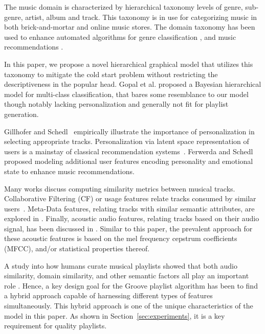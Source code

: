 The music domain is characterized by hierarchical taxonomy levels of genre, sub-genre, artist, album and track. This taxonomy is in use for categorizing music in both brick-and-mortar and online music stores. The domain taxonomy has been used to enhance automated algorithms for genre classification \cite{DecoroEtAl_2007_BayeAggrForHier}, and music recommendations \cite{Dror2011,Mnih2012}.

In this paper, we propose a novel hierarchical graphical model that utilizes this taxonomy to mitigate the cold start problem without restricting the descriptiveness in the popular head.
Gopal et al. \cite{NIPS2012_4609} proposed a Bayesian hierarchical model for multi-class classification, that bares some resemblance to our model though notably lacking personalization and generally not fit for playlist generation. 

Gillhofer and Schedl~\cite{Gillhofer2015} empirically illustrate the importance of personalization in selecting appropriate tracks. Personalization via latent space representation of users is a mainstay of classical recommendation systems~\cite{KorenBV09}. Ferwerda and Schedl~\cite{personalized_playlist_schedl} proposed modeling additional user features encoding personality and emotional state to enhance music recommendations.


Many works discuss computing similarity metrics between musical tracks. Collaborative Filtering (CF) or usage features relate tracks consumed by similar users~\cite{item2vec,Dror2011,Mcfee_learningsimilarity_CF}. Meta-Data features, relating tracks with similar semantic attributes, are explored in \cite{Bogdanov_content,  McfeeEtAl_2009_HeteEmbeForSubj, Pauws:ISMIR02,SlaneyEtAl_2008_LearAMetrFor}. Finally, acoustic audio features, relating tracks based on their audio signal, has been discussed in \cite{DoplerEtAl_2008_AcceMusiCollVia, Lee2011,a2mf}. Similar to this paper, the prevalent approach for these acoustic features is based on the mel frequency cepstrum coefficients (MFCC), and/or statistical properties thereof.

A study into how humans curate musical playlists showed that both audio similarity, domain similarity, and other semantic factors all play an important role \cite{Cunningham:06}. 
Hence, a key design goal for the Groove playlist algorithm has been to find a hybrid approach capable of harnessing different types of features simultaneously.
This hybrid approach is one of the unique characteristics of the model in this paper. As shown in Section~\ref{sec:experiments}, it is a key requirement for quality playlists.

